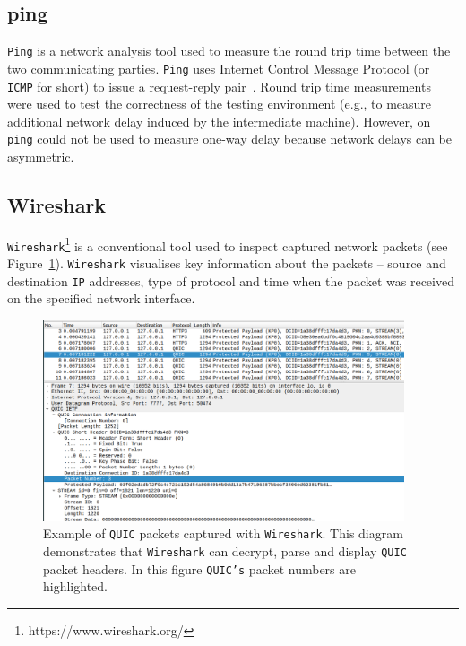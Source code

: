 \documentclass[12pt,a4paper]{report}
\begin{document}
\subsection{ping}
\texttt{Ping} is a network analysis tool used to measure the round trip time between the two communicating parties.
\texttt{Ping} uses Internet Control Message Protocol (or \texttt{ICMP} for short) to issue a request-reply pair~\cite{internet-control-message-protocol-icmp}.
Round trip time measurements were used to test the correctness of the testing environment (e.g., to measure additional network delay induced by the intermediate machine).
However, on \texttt{ping} could not be used to measure one-way delay because network delays can be asymmetric.





\subsection{Wireshark}

\texttt{Wireshark}\footnote{https://www.wireshark.org/} is a conventional tool used to inspect captured network packets (see Figure~\ref{fig:Wireshark_screenshot}).
\texttt{Wireshark} visualises key information about the packets -- source and destination \texttt{IP} addresses, type of protocol and time when the packet was received on the specified network interface.

    \begin{figure}[htbp]
    \centering
    \includegraphics[width=0.95\textwidth]{figs/Wireshark_screenshot.png}
    \caption[Example of \texttt{QUIC} packets captured with \texttt{Wireshark}]{Example of \texttt{QUIC} packets captured with \texttt{Wireshark}. This diagram demonstrates that \texttt{Wireshark} can decrypt, parse and display \texttt{QUIC} packet headers. In this figure \texttt{QUIC's} packet numbers are highlighted.}
    \label{fig:Wireshark_screenshot}
    \end{figure}
    
\end{document}
